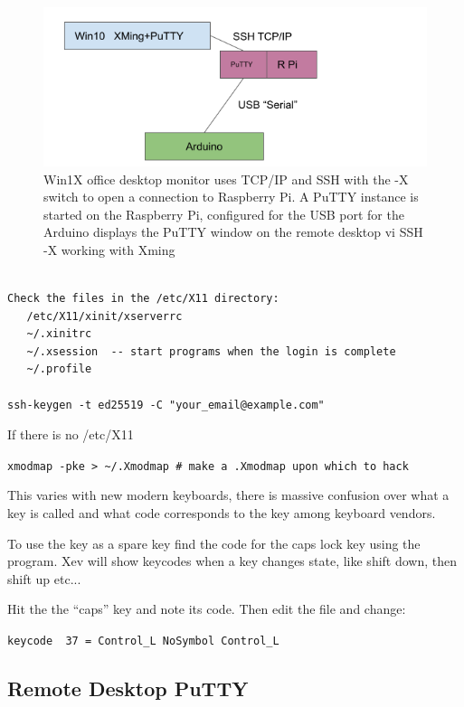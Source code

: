 \begin{figure}[h!]
\centering
\includegraphics[width=.5\textwidth]{images/PuTTYDiagram1.png}
\caption[Win1X use.]{Win1X office desktop monitor uses TCP/IP and SSH
  with the -X switch to open a connection to Raspberry Pi. A PuTTY
  instance is started on the Raspberry Pi, configured for the USB port
  for the Arduino displays the PuTTY window on the remote desktop vi
  SSH -X working with Xming} %
\label{figure:Diagram1}
\end{figure}

\begingroup \fontsize{10pt}{10pt}
\selectfont
\begin{verbatim} 

Check the files in the /etc/X11 directory:
   /etc/X11/xinit/xserverrc
   ~/.xinitrc
   ~/.xsession  -- start programs when the login is complete
   ~/.profile

ssh-keygen -t ed25519 -C "your_email@example.com"

\end{verbatim}
\endgroup

If there is no /etc/X11


\verb=xmodmap -pke > ~/.Xmodmap # make a .Xmodmap upon which to hack=

This varies with new modern keyboards, there is massive
confusion over what a key is called and what code corresponds to
the key among keyboard vendors. 

To use the  key as a spare  key find the
code for the caps lock key using the  program. Xev will show
keycodes when a key changes state, like shift down, then shift up
etc...  

Hit the the ``caps'' key and note its code. Then edit the 
file and change:

\verb/keycode  37 = Control_L NoSymbol Control_L/



\newpage
\subsection{Remote Desktop PuTTY}

